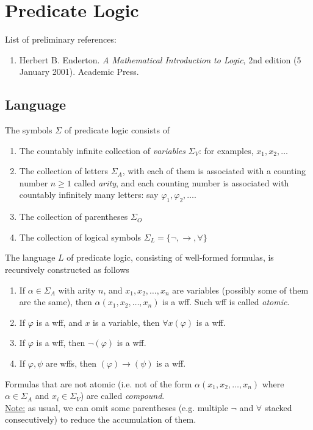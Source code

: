 \documentclass{treatise}
\begin{document}
\newpage

\section{Predicate Logic}
\begin{shaded}
List of preliminary references:
\begin{enumerate}
    \item Herbert B. Enderton. \textit{A Mathematical Introduction to Logic}, 2nd edition (5 January 2001). Academic Press.
\end{enumerate}
\hrulefill
\end{shaded}
\subsection{Language}
The symbols $\Sigma$ of predicate logic consists of
\begin{enumerate}
    \item The countably infinite collection of \emph{variables} $\Sigma_V$: for examples, $x_1, x_2, \hdots$
    \item The collection of letters $\Sigma_A$, with each of them is associated with a counting number $n \geq 1$ called \emph{arity}, and each counting number is associated with countably infinitely many letters: say $\varphi_1, \varphi_2, \hdots$.
    \item The collection of parentheses $\Sigma_O$
    \item The collection of logical symbols $\Sigma_L = \{ \neg, \to, \forall \}$
\end{enumerate}
The language $L$ of predicate logic, consisting of well-formed formulas, is recursively constructed as follows
\begin{enumerate}
    \item If $\alpha \in \Sigma_A$ with arity $n$, and $x_1, x_2, \hdots, x_n$ are variables (possibly some of them are the same), then $\alpha(x_1, x_2, \hdots, x_n)$ is a wff. Such wff is called \emph{atomic}.
    \item If $\varphi$ is a wff, and $x$ is a variable, then $\forall x (\varphi)$ is a wff.
    \item If $\varphi$ is a wff, then $\neg (\varphi)$ is a wff.
    \item If $\varphi, \psi$ are wffs, then $(\varphi) \to (\psi)$ is a wff.
\end{enumerate}
Formulas that are not atomic (i.e. not of the form $\alpha(x_1, x_2, \hdots, x_n)$ where $\alpha \in \Sigma_A$ and $x_i \in \Sigma_V$) are called \emph{compound}.
\\
\underline{Note:} as usual, we can omit some parentheses (e.g. multiple $\neg$ and $\forall$ stacked consecutively) to reduce the accumulation of them.
\end{document}
